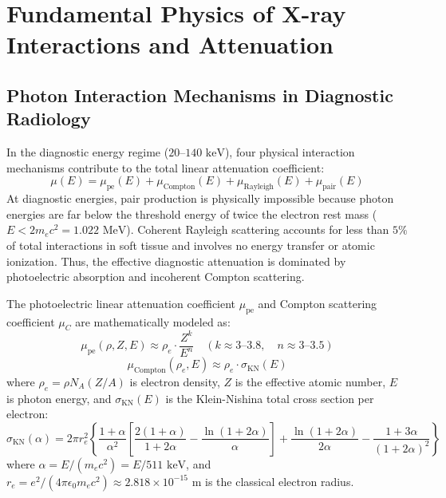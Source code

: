 \documentclass[11pt,a4paper]{article}
\begin{document}
\section{Fundamental Physics of X-ray Interactions and Attenuation}

\subsection{Photon Interaction Mechanisms in Diagnostic Radiology}
In the diagnostic energy regime ($20\text{--}140\text{ keV}$), four physical interaction mechanisms contribute to the total linear attenuation coefficient:
\begin{equation}
    \mu(E) = \mu_{\text{pe}}(E) + \mu_{\text{Compton}}(E) + \mu_{\text{Rayleigh}}(E) + \mu_{\text{pair}}(E)
\end{equation}
At diagnostic energies, pair production is physically impossible because photon energies are far below the threshold energy of twice the electron rest mass ($E < 2 m_e c^2 = 1.022\text{ MeV}$). Coherent Rayleigh scattering accounts for less than $5\%$ of total interactions in soft tissue and involves no energy transfer or atomic ionization. Thus, the effective diagnostic attenuation is dominated by photoelectric absorption and incoherent Compton scattering.

\begin{physicsbox}
The photoelectric linear attenuation coefficient $\mu_{\text{pe}}$ and Compton scattering coefficient $\mu_C$ are mathematically modeled as:
\begin{equation}
    \mu_{\text{pe}}(\rho, Z, E) \approx \rho_e \cdot \frac{Z^k}{E^n} \quad (k \approx 3\text{--}3.8, \quad n \approx 3\text{--}3.5)
\end{equation}
\begin{equation}
    \mu_{\text{Compton}}(\rho_e, E) \approx \rho_e \cdot \sigma_{\text{KN}}(E)
\end{equation}
where $\rho_e = \rho N_A (Z/A)$ is electron density, $Z$ is the effective atomic number, $E$ is photon energy, and $\sigma_{\text{KN}}(E)$ is the Klein-Nishina total cross section per electron:
\begin{equation}
    \sigma_{\text{KN}}(\alpha) = 2\pi r_e^2 \left\{ \frac{1+\alpha}{\alpha^2} \left[ \frac{2(1+\alpha)}{1+2\alpha} - \frac{\ln(1+2\alpha)}{\alpha} \right] + \frac{\ln(1+2\alpha)}{2\alpha} - \frac{1+3\alpha}{(1+2\alpha)^2} \right\}
\end{equation}
where $\alpha = E / (m_e c^2) = E / 511\text{ keV}$, and $r_e = e^2 / (4\pi \epsilon_0 m_e c^2) \approx 2.818 \times 10^{-15}\text{ m}$ is the classical electron radius.
\end{physicsbox}
\end{document}
